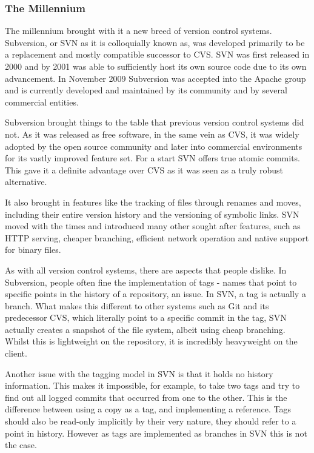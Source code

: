 \subsubsection{The Millennium}
The millennium brought with it a new breed of version control systems.
Subversion, or SVN as it is colloquially known as, was developed primarily to be a replacement and mostly compatible successor to CVS.
SVN was first released in 2000 and by 2001 was able to sufficiently host its own source code due to its own advancement.
In November 2009 Subversion was accepted into the Apache group and is currently developed and maintained by its community and by several commercial entities.

Subversion brought things to the table that previous version control systems did not.
As it was released as free software, in the same vein as CVS, it was widely adopted by the open source community and later into commercial environments for its vastly improved feature set.
For a start SVN offers true atomic commits.
This gave it a definite advantage over CVS as it was seen as a truly robust alternative.

It also brought in features like the tracking of files through renames and moves, including their entire version history and the versioning of symbolic links.
SVN moved with the times and introduced many other sought after features, such as HTTP serving, cheaper branching, efficient network operation and native support for binary files.

As with all version control systems, there are aspects that people dislike.
In Subversion, people often fine the implementation of tags - names that point to specific points in the history of a repository, an issue.
In SVN, a tag is actually a branch.
What makes this different to other systems such as Git and its predecessor CVS, which literally point to a specific commit in the tag, SVN actually creates a snapshot of the file system, albeit using cheap branching.
Whilst this is lightweight on the repository, it is incredibly heavyweight on the client.

Another issue with the tagging model in SVN is that it holds no history information.
This makes it impossible, for example, to take two tags and try to find out all logged commits that occurred from one to the other.
This is the difference between using a copy as a tag, and implementing a reference.
Tags should also be read-only implicitly by their very nature, they should refer to a point in history.
However as tags are implemented as branches in SVN this is not the case.

